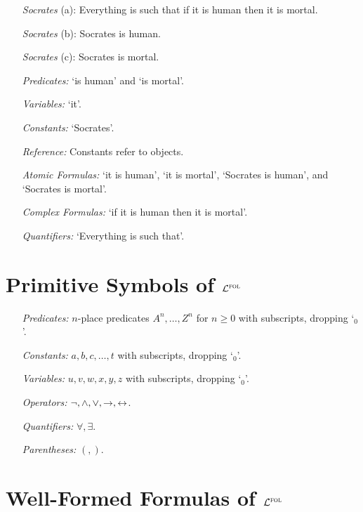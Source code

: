 \documentclass[a4paper, 11pt]{article} %
\begin{document}
\begin{enumerate}
  \item[\textit{Socrates} (a):] Everything is such that if it is human then it is mortal.
  \item[\textit{Socrates} (b):] Socrates is human.
  \item[\textit{Socrates} (c):] Socrates is mortal.
  \item[\it Predicates:] 
    `is human' and 
    `is mortal'.
  \item[\it Variables:] `it'. 
  \item[\it Constants:] `Socrates'. 
  \item[\it Reference:] Constants refer to objects.
  \item[\it Atomic Formulas:] 
    `it is human',
    `it is mortal',
    `Socrates is human', and
    `Socrates is mortal'. 
  \item[\it Complex Formulas:] `if it is human then it is mortal'.
  \item[\it Quantifiers:] `Everything is such that'.
\end{enumerate}





\section*{Primitive Symbols of $\mathcal{L}^{\textsc{fol}}$}

\begin{enumerate}
  \item[\it Predicates:] $n$-place predicates $A^n,\ldots,Z^n$  for $n\geq 0$ with subscripts, dropping `$_0$'.
  \item[\it Constants:] $a,b,c,\ldots,t$ with subscripts, dropping `$_0$'.
  \item[\it Variables:] $u,v,w,x,y,z$ with subscripts, dropping `$_0$'.
  \item[\it Operators:] $\neg, \wedge, \vee, \rightarrow, \leftrightarrow$.
  \item[\it Quantifiers:] $\forall, \exists$.
  \item[\it Parentheses:] $(,)$.
\end{enumerate}




\section*{Well-Formed Formulas of $\mathcal{L}^{\textsc{fol}}$}
\end{document}
